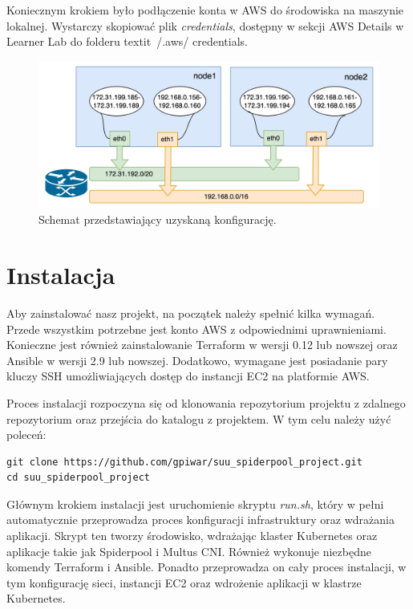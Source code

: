 \documentclass[onecolumn,12pt]{article}
\begin{document}
Koniecznym krokiem było podłączenie konta w AWS do środowiska na maszynie lokalnej. Wystarczy skopiować
plik \textit{credentials}, dostępny w  sekcji AWS Details w Learner Lab do folderu textit{~/.aws/
credentials}.

\begin{figure}
    \centering
    \includegraphics[width=0.8\linewidth]{alicloud-k8s-network_NOT_OURS.png}
    \caption{Schemat przedstawiający uzyskaną konfigurację.}
    \label{fig:enter-label}
\end{figure}

\section{Instalacja}

Aby zainstalować nasz projekt, na początek należy spełnić kilka wymagań. Przede wszystkim 
potrzebne jest konto AWS z odpowiednimi uprawnieniami. Konieczne jest również zainstalowanie
Terraform w wersji 0.12 lub nowszej oraz Ansible w wersji 2.9 lub nowszej. Dodatkowo, wymagane
jest posiadanie pary kluczy SSH umożliwiających dostęp do instancji EC2 na platformie AWS.

Proces instalacji rozpoczyna się od klonowania repozytorium projektu z zdalnego repozytorium 
oraz przejścia do katalogu z projektem. W tym celu należy użyć poleceń:

\begin{verbatim}
git clone https://github.com/gpiwar/suu_spiderpool_project.git
cd suu_spiderpool_project
\end{verbatim}

Głównym krokiem instalacji jest uruchomienie skryptu \textit{run.sh}, który w pełni automatycznie przeprowadza proces konfiguracji infrastruktury oraz wdrażania aplikacji. Skrypt ten tworzy środowisko, wdrażając klaster Kubernetes oraz aplikacje takie jak Spiderpool i Multus CNI. Również wykonuje niezbędne komendy Terraform i Ansible. Ponadto przeprowadza on cały proces instalacji, w tym konfigurację sieci, instancji EC2 oraz wdrożenie aplikacji w klastrze Kubernetes.
\end{document}
